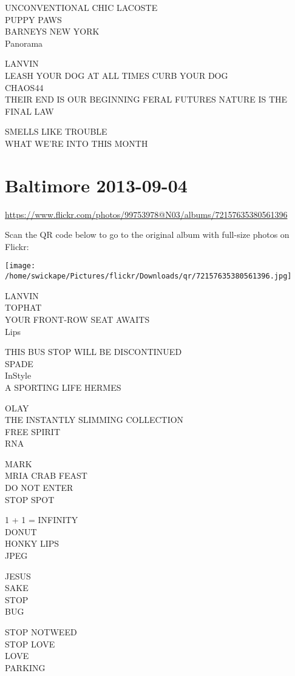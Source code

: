 \documentclass[10pt,letterpaper]{article}
\begin{document}
UNCONVENTIONAL CHIC LACOSTE\\
PUPPY PAWS\\
BARNEYS NEW YORK\\
Panorama

LANVIN\\
LEASH YOUR DOG AT ALL TIMES CURB YOUR DOG\\
CHAOS44\\
THEIR END IS OUR BEGINNING FERAL FUTURES NATURE IS THE FINAL LAW

SMELLS LIKE TROUBLE\\
WHAT WE'RE INTO THIS MONTH


\section*{Baltimore 2013-09-04}

\url{https://www.flickr.com/photos/99753978@N03/albums/72157635380561396}

Scan the QR code below to go to the original album with full-size photos on Flickr:

\texttt{[image: /home/swickape/Pictures/flickr/Downloads/qr/72157635380561396.jpg]}


LANVIN\\
TOPHAT\\
YOUR FRONT{-}ROW SEAT AWAITS\\
Lips

THIS BUS STOP WILL BE DISCONTINUED\\
SPADE\\
InStyle\\
A SPORTING LIFE HERMES

OLAY\\
THE INSTANTLY SLIMMING COLLECTION\\
FREE SPIRIT\\
RNA

MARK\\
MRIA CRAB FEAST\\
DO NOT ENTER\\
STOP SPOT

1 + 1 = INFINITY\\
DONUT\\
HONKY LIPS\\
JPEG

JESUS\\
SAKE\\
STOP\\
BUG

STOP NOTWEED\\
STOP LOVE\\
LOVE\\
PARKING
\end{document}
